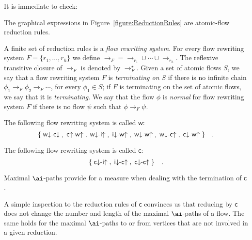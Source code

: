It is immediate to check:

\begin{proposition}\label{proposition:ValidReductionRules}
The graphical expressions in Figure~\vref{figure:ReductionRules} are atomic-flow reduction rules.
\end{proposition}

\begin{definition}\label{definition:FlowRewritingSystem}
A finite set of reduction rules is a \emph{flow rewriting system}. For every flow rewriting system $F=\{r_1,\dots,r_h\}$ we define ${\to_F}={\to_{r_1}\cup\cdots\cup{\to_{r_h}}}$. The reflexive transitive closure of $\to_F$ is denoted by $\to_F^\star$. Given a set of atomic flows $S$, we say that a flow rewriting system $F$ is \emph{terminating on $S$} if there is no infinite chain $\phi_1\to_F\phi_2\to_F\cdots$, for every $\phi_1\in S$; if $F$ is terminating on the set of atomic flows, we say that it is \emph{terminating}. We say that the flow $\phi$ is \emph{normal} for flow rewriting system $F$ if there is no flow $\psi$ such that $\phi\to_F\psi$.
\end{definition}

\newcommand{\frw}{{\mathsf w}}
\begin{definition}\label{definition:FlowRewritingWeakening}
The following flow rewriting system is called $\frw$:
\[
\{\;{{\mathsf w}{\downarrow}{\hbox{-}}{\mathsf c}{\downarrow}}\;,\;{{\mathsf c}{\uparrow }{\hbox{-}}{\mathsf w}{\uparrow }}\;,\;{{\mathsf w}{\downarrow}{\hbox{-}}{\mathsf i}{\uparrow }}\;,\;{{\mathsf i}{\downarrow}{\hbox{-}}{\mathsf w}{\uparrow }}\;,\;{{\mathsf w}{\downarrow}{\hbox{-}}{\mathsf w}{\uparrow }}\;,\;{{\mathsf w}{\downarrow}{\hbox{-}}{\mathsf c}{\uparrow }}\;,\;{{\mathsf c}{\downarrow}{\hbox{-}}{\mathsf w}{\uparrow }}\;\}
\quad.
\]
\end{definition}

\newcommand{\frc}{{\mathsf c}}
\begin{definition}\label{definition:FlowRewritingContraction}
The following flow rewriting system is called $\frc$:
\[
\{\;{{\mathsf c}{\downarrow}{\hbox{-}}{\mathsf i}{\uparrow }}\;,\;{{\mathsf i}{\downarrow}{\hbox{-}}{\mathsf c}{\uparrow }}\;,\;{{\mathsf c}{\downarrow}{\hbox{-}}{\mathsf c}{\uparrow }}\;\}\quad.
\]
\end{definition}

Maximal $\ai$-paths provide for a measure when dealing with the termination of $\frc$.

\begin{remark}\label{remark:Rank}
A simple inspection to the reduction rules of $\frc$ convinces us that reducing by $\frc$ does not change the number and length of the maximal $\ai$-paths of a flow. The same holds for the maximal $\ai$-paths to or from vertices that are not involved in a given reduction.
\end{remark}

